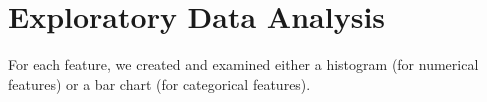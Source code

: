 \section{Exploratory Data Analysis}

For each feature, we created and examined either a histogram (for numerical features) or a bar chart (for categorical features).
